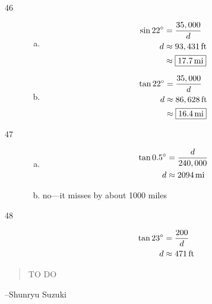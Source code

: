 \documentclass{exam}
\newcommand{\dg}{\ensuremath{^\circ}}
\begin{document}
\begin{description}
      \item[46]
        \begin{enumerate}[(a)]
          \item 
            \begin{align*}
              \sin 22 \dg & = \frac{35,000}{d} \\
              d           & \approx \unit[93,431]{ft} \\
                          & \approx \boxed{ \unit[17.7]{mi} } \\
            \end{align*}

          \item 
            \begin{align*}
              \tan 22 \dg & = \frac{35,000}{d} \\
              d           & \approx \unit[86,628]{ft} \\
                          & \approx \boxed{ \unit[16.4]{mi} } \\
            \end{align*}

        \end{enumerate}

      \item[47]
        \begin{enumerate}[(a)]
          \item 
            \begin{align*}
              \tan 0.5 \dg & = \frac{d}{240,000} \\
              d           & \approx \unit[2094]{mi} \\
            \end{align*}

          \item 
            no---it misses by about 1000 miles
        \end{enumerate}

      \item[48]
        \begin{align*}
          \tan 23 \dg & = \frac{200}{d} \\
          d           & \approx \unit[471]{ft} \\
        \end{align*}

    \end{description}

  \else
    \vspace{1 cm}
    \begin{quote}
      \begin{em}
        TO DO
      \end{em}
    \end{quote}
    \hspace{1 cm} --Shunryu Suzuki
  \fi
\end{document}
